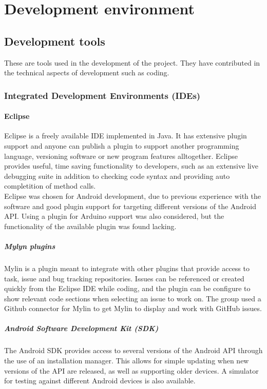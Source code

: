 \chapter{Development environment}
\section{Development tools}
These are tools used in the development of the project. They have contributed in the technical aspects of development such as coding. 
\subsection{Integrated Development Environments (IDEs)}
\subsubsection{Eclipse}
Eclipse is a freely available IDE implemented in Java. It has extensive plugin support and anyone can publish a plugin to support another programming language, versioning software or new program features alltogether. Eclipse provides useful, time saving functionality to developers, such as an extensive live debugging suite in addition to checking code syntax and providing auto completition of method calls.\\
Eclipse was chosen for Android development, due to previous experience with the software and good plugin support for targeting different versions of the Android API. Using a plugin for Arduino support was also considered, but the functionality of the available plugin was found lacking. %

\paragraph{Mylyn plugins}
Mylin is a plugin meant to integrate with other plugins that provide access to task, issue and bug tracking repositories. Issues can be referenced or created quickly from the Eclipse IDE while coding, and the plugin can be configure to show relevant code sections when selecting an issue to work on. The group used a Github connector for Mylin to get Mylin to display and work with GitHub issues.

\paragraph{Android Software Development Kit (SDK)}
The Android SDK provides access to several versions of the Android API through the use of an installation manager. This allows for simple updating when new versions of the API are released, as well as supporting older devices. A simulator for testing against different Android devices is also available.

